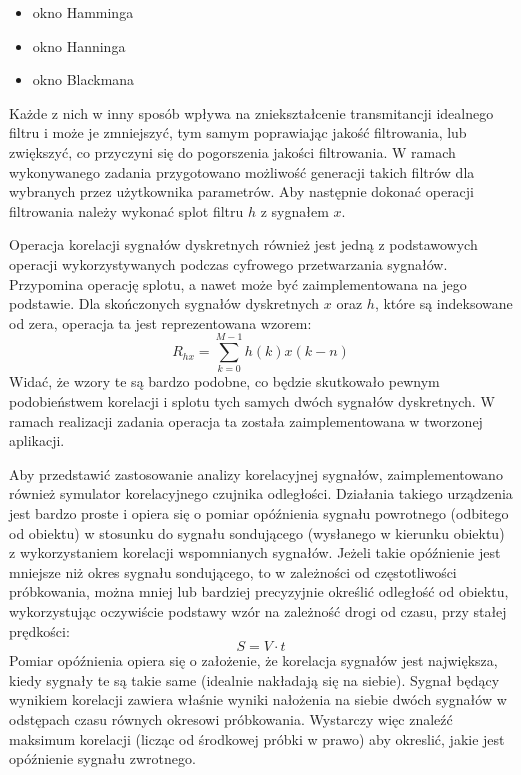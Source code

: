 \documentclass[12pt]{article}
\begin{document}
{\begin{itemize}
            \item okno Hamminga
            \item okno Hanninga
            \item okno Blackmana
        \end{itemize}
        Każde z nich w inny sposób wpływa na zniekształcenie transmitancji idealnego filtru i może
        je zmniejszyć, tym samym poprawiając jakość filtrowania, lub zwiększyć, co przyczyni się do
        pogorszenia jakości filtrowania. W ramach wykonywanego zadania przygotowano możliwość
        generacji takich filtrów dla wybranych przez użytkownika parametrów. Aby następnie dokonać
        operacji filtrowania należy wykonać splot filtru $h$ z sygnałem $x$.

        Operacja korelacji sygnałów dyskretnych również jest jedną z podstawowych operacji
        wykorzystywanych podczas cyfrowego przetwarzania sygnałów. Przypomina operację splotu, a
        nawet może być zaimplementowana na jego podstawie. Dla skończonych sygnałów dyskretnych $x$
        oraz $h$, które są indeksowane od zera, operacja ta jest reprezentowana wzorem:
        \begin{equation}
            R_{hx} = \sum_{k = 0}^{M - 1}h(k)x(k - n) \label{wzor:korelacja}
        \end{equation}
        Widać, że wzory te są bardzo podobne, co będzie skutkowało pewnym podobieństwem korelacji i
        splotu tych samych dwóch sygnałów dyskretnych. W ramach realizacji zadania operacja ta
        została zaimplementowana w tworzonej aplikacji.

        Aby przedstawić zastosowanie analizy korelacyjnej sygnałów, zaimplementowano również
        symulator korelacyjnego czujnika odległości. Działania takiego urządzenia jest bardzo
        proste i opiera się o pomiar opóźnienia sygnału powrotnego (odbitego od obiektu) w
        stosunku do sygnału sondującego (wysłanego w kierunku obiektu) z wykorzystaniem korelacji
        wspomnianych sygnałów. Jeżeli takie opóźnienie jest mniejsze niż okres sygnału sondującego,
        to w zależności od częstotliwości próbkowania, można mniej lub bardziej precyzyjnie określić
        odległość od obiektu, wykorzystując oczywiście podstawy wzór na zależność drogi od czasu,
        przy stałej prędkości:
        \begin{equation}
            S = V \cdot t \label{wzor:droga}
        \end{equation}
        Pomiar opóźnienia opiera się o założenie, że korelacja sygnałów jest największa, kiedy
        sygnały te są takie same (idealnie nakładają się na siebie). Sygnał będący wynikiem
        korelacji zawiera właśnie wyniki nałożenia na siebie dwóch sygnałów w odstępach czasu
        równych okresowi próbkowania. Wystarczy więc znaleźć maksimum korelacji (licząc od środkowej
        próbki w prawo) aby okreslić, jakie jest opóźnienie sygnału zwrotnego.
    }
\end{document}
